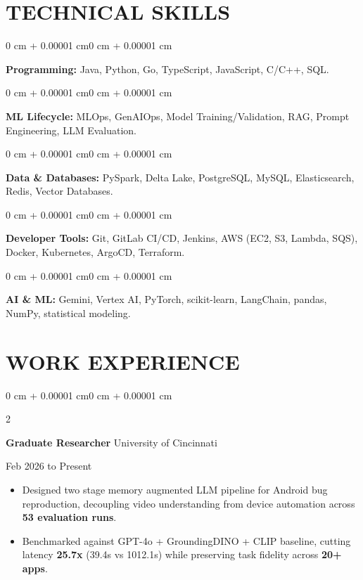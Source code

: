 \documentclass[10pt, letterpaper]{article}
\newenvironment{highlights}{
    \begin{itemize}[
        topsep=0.10 cm,
        parsep=0.06 cm,
        partopsep=0pt,
        itemsep=0.06 cm,
        leftmargin=12pt
    ]
}{
    \end{itemize}
}
\newenvironment{onecolentry}{
    \begin{adjustwidth}{0 cm + 0.00001 cm}{0 cm + 0.00001 cm}
}{
    \end{adjustwidth}
}
\newenvironment{twocolentry}[2][]{
    \onecolentry
    \def\secondColumn{#2}
    \setcolumnwidth{\fill, 4.5 cm}
    \begin{paracol}{2}
}{
    \switchcolumn \raggedleft \secondColumn
    \end{paracol}
    \endonecolentry
}
\begin{document}
\section{TECHNICAL SKILLS}
\begin{onecolentry}
\textbf{Programming:} Java, Python, Go, TypeScript, JavaScript, C/C++, SQL.
\end{onecolentry}
\vspace{0.06 cm}
\begin{onecolentry}
\textbf{ML Lifecycle:} MLOps, GenAIOps, Model Training/Validation, RAG, Prompt Engineering, LLM Evaluation.
\end{onecolentry}
\vspace{0.06 cm}
\begin{onecolentry}
\textbf{Data \& Databases:} PySpark, Delta Lake, PostgreSQL, MySQL, Elasticsearch, Redis, Vector Databases.
\end{onecolentry}
\vspace{0.06 cm}
\begin{onecolentry}
\textbf{Developer Tools:} Git, GitLab CI/CD, Jenkins, AWS (EC2, S3, Lambda, SQS), Docker, Kubernetes, ArgoCD, Terraform.
\end{onecolentry}
\vspace{0.06 cm}
\begin{onecolentry}
\textbf{AI \& ML:} Gemini, Vertex AI, PyTorch, scikit-learn, LangChain, pandas, NumPy, statistical modeling.
\end{onecolentry}

\section{WORK EXPERIENCE}
\begin{twocolentry}{Feb 2026 to Present}
\textbf{Graduate Researcher} \textbar{} University of Cincinnati
\end{twocolentry}
\begin{highlights}
  \item Designed two stage memory augmented LLM pipeline for Android bug reproduction, decoupling video understanding from device automation across \textbf{53 evaluation runs}.
  \item Benchmarked against GPT-4o + GroundingDINO + CLIP baseline, cutting latency \textbf{25.7x} (39.4s vs 1012.1s) while preserving task fidelity across \textbf{20+ apps}.
\end{highlights}

\vspace{0.15 cm}
\end{document}
